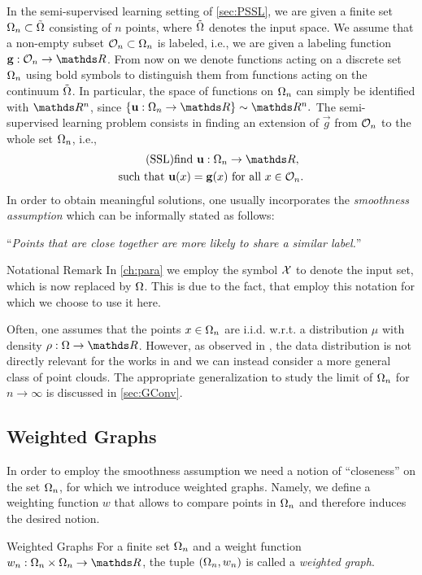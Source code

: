 In the semi-supervised learning setting of \cref{sec:PSSL}, we are given a finite set $\Omega_n\subset \tilde{\Omega}$ consisting of $n$ points, where $\tilde{\Omega}$ 
denotes the input space. We assume that a non-empty subset $\mathcal{O}_n \subset \Omega_n$ is labeled, i.e., we are given a labeling function
$\vec g:\conset_n\to\R$. From now on we denote functions acting on a discrete set $\Omega_n$ using bold symbols to distinguish them from functions acting on the continuum $\tilde{\Omega}$. In particular, the space of functions on $\Omega_n$ can simply be identified with $\R^n$, since $\{\vec u:\domain_n\to\R\} \sim \R^n.$
%
\noindent%
The semi-supervised learning problem consists in finding an extension of $\vec g$ from $\mathcal{O}_n$ to the whole set $\Omega_n$, i.e.,
%
\begin{gather}\label{eq:SSL}
\begin{gathered}\tag{SSL}
\text{find } \vec u:\domain_n\to\R,\\
\text{such that } \vec u(x) = \vec g(x) \text{ for all } x\in\conset_n.
\end{gathered}
\end{gather}
%
%
%
%
In order to obtain meaningful solutions, one usually incorporates the \emph{smoothness assumption} \cite{subramanya2014graph} which can be informally stated as follows:
%
\begin{center}
\enquote{\textit{Points that are close together are more likely to share a similar label.}}
\end{center}
%
%

\begin{remark}{Notational Remark}{}
In \cref{ch:para} we employ the symbol $\mathcal{X}$ to denote the input set, which is now replaced by $\Omega$. This is due to the fact, that \cite{roith2022continuum,bungert2021uniform, bungert2022ratio} employ this notation for which we choose to use it here.
\end{remark}
%
%
\noindent%
Often, one assumes that the points $x\in\Omega_n$ are i.i.d. w.r.t. a distribution $\mu$ with density $\rho:\domain\to\R$. However, as observed in \cite{roith2022msc}, the data distribution is not directly relevant for the works in \cite{roith2022continuum, bungert2021uniform} and we can instead consider a more general class of point clouds. The appropriate generalization to study the limit of $\Omega_n$ for $n\to\infty$ is discussed in \cref{sec:GConv}.
%
%
\subsection{Weighted Graphs}
In order to employ the smoothness assumption we need a notion of \enquote{closeness} on the set $\Omega_n$, for which we introduce weighted graphs. Namely, we define a weighting function $w$ that allows to compare points in $\Omega_n$ and therefore induces the desired notion. 
%
\begin{definition}{Weighted Graphs}{}
For a finite set $\Omega_n$ and a weight function $w_n:\domain_n\times \domain_n\to\R$, the tuple $(\Omega_n,w_n)$ is called a \emph{weighted graph}.
\end{definition}
%
%
